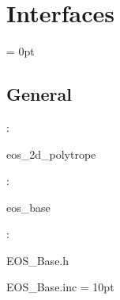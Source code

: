 
\section{Interfaces} 


\parskip = 0pt

\vspace{3mm} \subsection*{General}

: 

eos\_2d\_polytrope
\vspace{2mm}

: 

eos\_base
\vspace{2mm}

\vspace{5mm}

: 

EOS\_Base.h

EOS\_Base.inc
\vspace{2mm}\parskip = 10pt 
